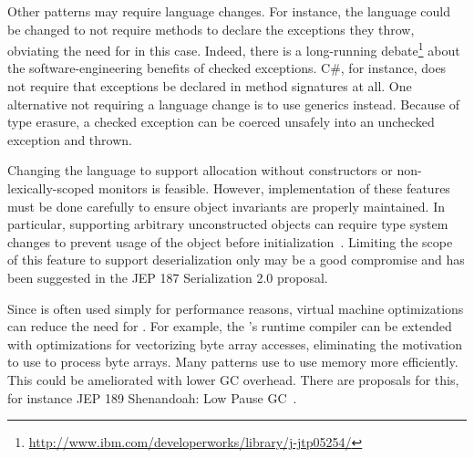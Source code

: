 Other patterns may require \java{} language changes.
For instance, 
the language could be changed to not require methods to declare the exceptions they throw,
obviating the need for \unsafe{} in this case.
Indeed, there is a long-running debate\footnote{\url{http://www.ibm.com/developerworks/library/j-jtp05254/}} about the software-engineering benefits of checked exceptions.
C\#, for instance, does not require that exceptions be declared in method signatures at all.
One alternative not requiring a language change
is to use \java{} generics
instead.
Because of type erasure, a checked exception can be coerced unsafely into an unchecked exception and thrown.

Changing the language to support allocation without constructors or non-lexically-scoped monitors is feasible.
However, implementation of these
features must be done carefully to ensure object invariants
are properly maintained.
In particular, supporting arbitrary unconstructed
objects can require type system changes to prevent usage of the object 
before initialization~\citep{qiMaskedTypesSound2009}.
Limiting the scope of this feature to support deserialization only may be a good compromise and
has been suggested in the JEP 187 Serialization 2.0 proposal.

Since \unsafe{} is often used simply for performance reasons,
virtual machine optimizations can reduce the need for \unsafe{}.
For example, the \jvm{}'s runtime compiler can be extended with optimizations for vectorizing byte array accesses,
eliminating the motivation to use \unsafe{} to process byte arrays.
Many patterns use \unsafe{} to use memory more efficiently.
This could be ameliorated with lower GC overhead.
There are proposals for this, for instance JEP 189 Shenandoah:
Low Pause GC~\citep{jep189}.